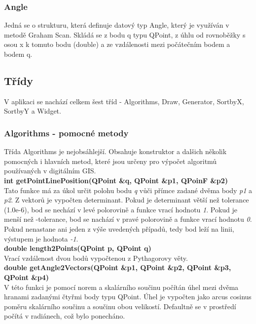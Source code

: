 \documentclass[a4paper,11pt,twoside]{article}
\begin{document}
\subsubsection{Angle}
Jedná se o strukturu, která definuje datový typ Angle, který je využíván v metodě Graham Scan. Skládá se z bodu q typu QPoint, z úhlu od rovnoběžky s osou x k tomuto bodu (double) a ze vzdálenosti mezi počátečním bodem a bodem q.

\subsection{Třídy}
V aplikaci se nachází celkem šest tříd - Algorithms, Draw, Generator, SortbyX, SortbyY a Widget. 

\subsubsection{Algorithms - pomocné metody}
Třída Algorithms je nejobsáhlejší. Obsahuje konstruktor a dalšich několik pomocných i hlavních metod, které jsou určeny pro výpočet algoritmů používaných v digitálním GIS. \\

\noindent\textbf{int getPointLinePosition(QPoint \&q, QPoint \&p1, QPoinF \&p2)}\\
Tato funkce má za úkol určit polohu bodu \textit{q} vůči přímce zadané dvěma body \textit{p1} a \textit{p2}. Z vektorů je vypočten determinant. Pokud je determinant větší než tolerance (1.0e-6), bod se nechází v levé polorovině a funkce vrací hodnotu \textit{1}. Pokud je menší než -tolerance, bod se nachází v pravé polorovině a funkce vrací hodnotu \textit{0}.  Pokud nenastane ani jeden z výše uvedených případů, tedy bod leží na linii, výstupem je hodnota \textit{-1}.\\

\noindent\textbf{double length2Points(QPoint p, QPoint q)}\\
Vrací vzdálenost dvou bodů vypočtenou z Pythagorovy věty.\\

\noindent\textbf{double getAngle2Vectors(QPoint \&p1, QPoint \&p2, QPoint \&p3, \\ QPoint \&p4)}\\
V této funkci je pomocí norem a skalárního součinu počítán úhel mezi dvěma hranami zadanými čtyřmi body typu QPoint. Úhel je vypočten jako arcus cosinus poměru skalárního součinu a součinu obou velikostí. Defaultně se v prostředí počítá v radiánech, což bylo ponecháno.\\
\end{document}
